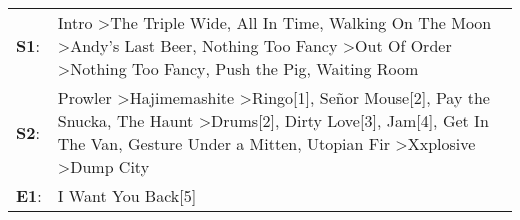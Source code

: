 \begin{supertabular}{p{0.03\textwidth}p{0.92\textwidth}}
 \textbf{S1}:  &                                                                                                                                                       Intro\textsuperscript{} \textgreater \enspace The Triple Wide\textsuperscript{}, \enspace All In Time\textsuperscript{}, \enspace Walking On The Moon\textsuperscript{} \textgreater \enspace Andy's Last Beer\textsuperscript{}, \enspace Nothing Too Fancy\textsuperscript{} \textgreater \enspace Out Of Order\textsuperscript{} \textgreater \enspace Nothing Too Fancy\textsuperscript{}, \enspace Push the Pig\textsuperscript{}, \enspace Waiting Room\textsuperscript{}  \enspace  \\
 \textbf{S2}:  &  Prowler\textsuperscript{} \textgreater \enspace Hajimemashite\textsuperscript{} \textgreater \enspace Ringo[1]\textsuperscript{}, \enspace Señor Mouse[2]\textsuperscript{}, \enspace Pay the Snucka\textsuperscript{}, \enspace The Haunt\textsuperscript{} \textgreater \enspace Drums[2]\textsuperscript{}, \enspace Dirty Love[3]\textsuperscript{}, \enspace Jam[4]\textsuperscript{}, \enspace Get In The Van\textsuperscript{}, \enspace Gesture Under a Mitten\textsuperscript{}, \enspace Utopian Fir\textsuperscript{} \textgreater \enspace Xxplosive\textsuperscript{} \textgreater \enspace Dump City\textsuperscript{}  \enspace  \\
 \textbf{E1}:  &                                                                                                                                                                                                                                                                                                                                                                                                                                                                                                                                                                                                  I Want You Back[5]\textsuperscript{}  \enspace  \\
\end{supertabular}
